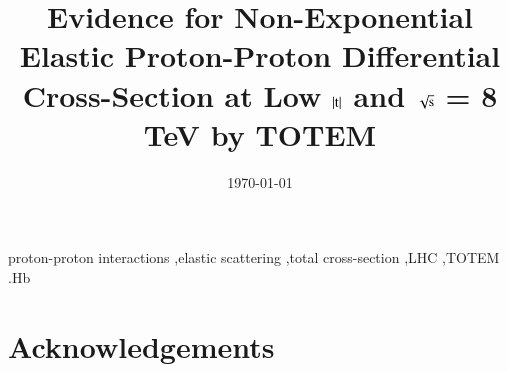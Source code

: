 \documentclass[3p,onecolumn,12pt,times,longtitle]{elsarticle}
\begin{document}
\begin{frontmatter}

\title{Evidence for Non-Exponential Elastic Proton-Proton Differential Cross-Section at Low $|\hbox{t}|$ and $\sqrt{\hbox{s}}$ = 8 TeV by TOTEM}



\date{\today}


\begin{abstract}

\end{abstract}

\begin{keyword}
proton-proton interactions \sep elastic scattering \sep total cross-section \sep LHC \sep TOTEM
.Hb %
\end{keyword}
\end{frontmatter}















\section*{Acknowledgements}



\begin{thebibliography}{99}

\end{thebibliography}
\end{document}
